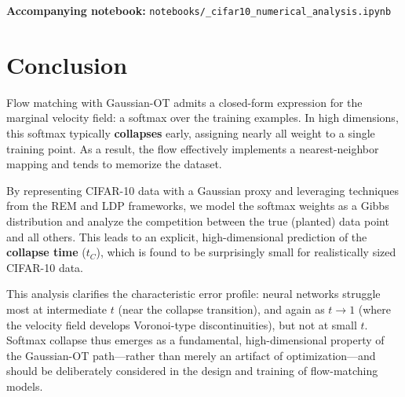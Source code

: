 \documentclass[11pt]{article}
\begin{document}
\noindent \textbf{Accompanying notebook:} \texttt{notebooks/\_cifar10\_numerical\_analysis.ipynb}

\section{Conclusion}
Flow matching with Gaussian-OT admits a closed-form expression for the marginal velocity field: a softmax over the training examples. In high dimensions, this softmax typically \textbf{collapses} early, assigning nearly all weight to a single training point. As a result, the flow effectively implements a nearest-neighbor mapping and tends to memorize the dataset.

By representing CIFAR-10 data with a Gaussian proxy and leveraging techniques from the REM and LDP frameworks, we model the softmax weights as a Gibbs distribution and analyze the competition between the true (planted) data point and all others. This leads to an explicit, high-dimensional prediction of the \textbf{collapse time} ($t_C$), which is found to be surprisingly small for realistically sized CIFAR-10 data.

This analysis clarifies the characteristic error profile: neural networks struggle most at intermediate $t$ (near the collapse transition), and again as $t \to 1$ (where the velocity field develops Voronoi-type discontinuities), but not at small $t$. Softmax collapse thus emerges as a fundamental, high-dimensional property of the Gaussian-OT path---rather than merely an artifact of optimization---and should be deliberately considered in the design and training of flow-matching models.

\printbibliography
\end{document}
